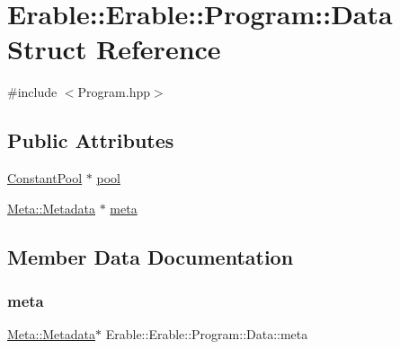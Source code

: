 \hypertarget{struct_erable_1_1_erable_1_1_program_1_1_data}{}\section{Erable\+::Erable\+::Program\+::Data Struct Reference}
\label{struct_erable_1_1_erable_1_1_program_1_1_data}


{\ttfamily \#include $<$Program.\+hpp$>$}

\subsection*{Public Attributes}
\begin{DoxyCompactItemize}
\item 
\mbox{\hyperlink{class_erable_1_1_constant_pool}{Constant\+Pool}} $\ast$ \mbox{\hyperlink{struct_erable_1_1_erable_1_1_program_1_1_data_a166bb93a1188ab05207d1bc1e7b877f9}{pool}}
\item 
\mbox{\hyperlink{class_erable_1_1_erable_1_1_meta_1_1_metadata}{Meta\+::\+Metadata}} $\ast$ \mbox{\hyperlink{struct_erable_1_1_erable_1_1_program_1_1_data_acb90a81aaf10884dee248c60936ab58b}{meta}}
\end{DoxyCompactItemize}


\subsection{Member Data Documentation}
\mbox{\label{struct_erable_1_1_erable_1_1_program_1_1_data_acb90a81aaf10884dee248c60936ab58b}} 
\subsubsection{\texorpdfstring{meta}{meta}}
{\footnotesize\ttfamily \mbox{\hyperlink{class_erable_1_1_erable_1_1_meta_1_1_metadata}{Meta\+::\+Metadata}}$\ast$ Erable\+::\+Erable\+::\+Program\+::\+Data\+::meta}

\mbox{\label{struct_erable_1_1_erable_1_1_program_1_1_data_a166bb93a1188ab05207d1bc1e7b877f9}} 
